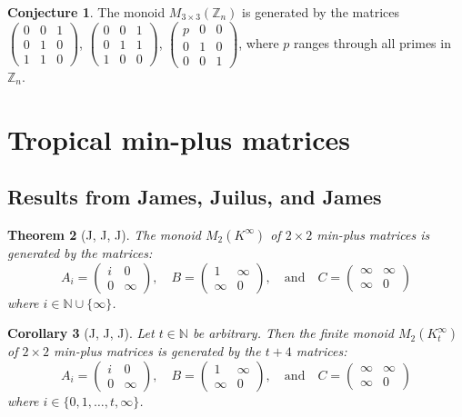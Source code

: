 \documentclass{article}
\newcommand{\N}{\mathbb{N}}
\newcommand{\mat}[4]{\begin{pmatrix}#1&#2\\#3&#4\end{pmatrix}}
\newtheorem{thm}{Theorem}[section]
\newtheorem{cor}[thm]{Corollary}
\theoremstyle{definition}
\newtheorem{conj}[thm]{Conjecture}
\begin{document}
\begin{conj}
  The monoid $M_{3 \times 3}(\mathbb{Z}_{n})$ is generated by the matrices
  $\begin{pmatrix}
     0 & 0 & 1 \\
     0 & 1 & 0 \\
     1 & 1 & 0
   \end{pmatrix}$,
  $\begin{pmatrix}
     0 & 0 & 1 \\
     0 & 1 & 1 \\
     1 & 0 & 0
   \end{pmatrix}$,
  $\begin{pmatrix}
     p & 0 & 0 \\
     0 & 1 & 0 \\
     0 & 0 & 1
   \end{pmatrix}$,
   where $p$ ranges through all primes in $\mathbb{Z}_{n}$.
\end{conj}


\clearpage
\section{Tropical min-plus matrices}

\subsection*{Results from James, Juilus, and James}

\begin{thm}[J, J, J]\label{thm-min-plus}
  The monoid $M_{2}(K^{\infty})$ of $2 \times 2$ min-plus matrices is
  generated by the matrices:
  \begin{equation*}
          A_{i} = \mat{i}{0}{0}{\infty},
    \quad B     = \mat{1}{\infty}{\infty}{0},
    \quad \text{and}
    \quad C     =  \mat{\infty}{\infty}{\infty}{0}
  \end{equation*}
  where $i \in \N \cup \{\infty\}$.
\end{thm}

\begin{cor}[J, J, J]\label{cor-finite-min-plus}
  Let $t \in \N$ be arbitrary. Then the finite monoid $M_{2}(K^{\infty}_t)$ of
  $2 \times 2$ min-plus matrices is generated by the $t + 4$ matrices:
  \begin{equation*}
          A_{i} = \mat{i}{0}{0}{\infty},
    \quad B     = \mat{1}{\infty}{\infty}{0},
    \quad \text{and}
    \quad C     =  \mat{\infty}{\infty}{\infty}{0}
  \end{equation*}
  where $i \in \{0, 1, \ldots, t, \infty\}$.
\end{cor}
\end{document}
